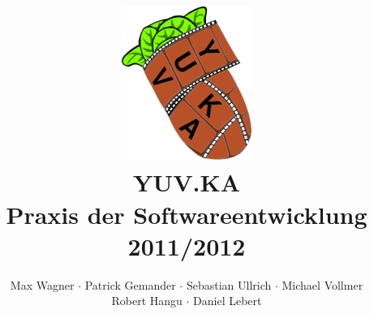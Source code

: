 \documentclass{scrartcl}
\begin{document}
\title{
    \hspace{-0.5cm} \includegraphics[height=5cm]{resources/logo.png} \\[1cm]
    \Huge{YUV.KA} \\ \large{Praxis der Softwareentwicklung 2011/2012}
}
\author{Max Wagner $\cdot$ Patrick Gemander $\cdot$ Sebastian Ullrich $\cdot$ Michael Vollmer \\ Robert Hangu $\cdot$ Daniel Lebert}
\maketitle

\newpage
\mbox{}
\newpage
\mbox{}

\tableofcontents













\end{document}
